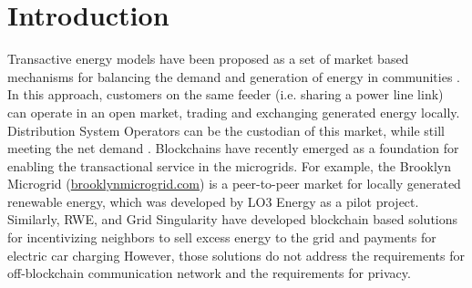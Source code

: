 \section{Introduction}


Transactive energy models have been proposed as a set of market based mechanisms for balancing the demand and generation of energy in communities \cite{kok2016society,cox2013structured,melton2013gridwise}.
 In this approach, customers on the same feeder (i.e. sharing a power line link) can operate in an open market, trading and exchanging generated energy locally. Distribution System Operators can be the custodian of this market, while still meeting the net demand \cite{7462854}. Blockchains have  recently emerged as a foundation for enabling the transactional service in the microgrids. For example, the Brooklyn Microgrid
(\url{brooklynmicrogrid.com}) is a peer-to-peer market for locally
generated renewable energy, which was developed by LO3 Energy as a pilot project. Similarly, RWE, and Grid Singularity have developed blockchain based solutions for incentivizing neighbors to sell excess energy to the grid and payments for electric car charging %
However, those solutions do not address the requirements for off-blockchain communication network and the requirements for privacy. 
 
 
 
 

